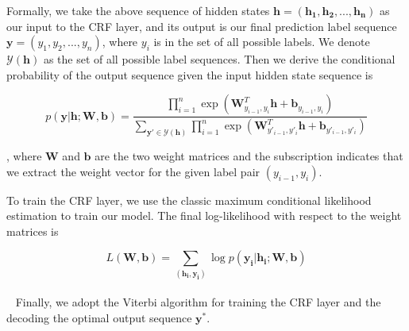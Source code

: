 Formally, we take the above sequence of hidden states  $ \mathbf{h} = ( \mathbf{h_1}, \mathbf{h_2},...,\mathbf{h_n})$ as our input to the CRF layer, and its output is our final prediction label sequence $\mathbf{y} = ( {y_1}, {y_2},...,{y_n})$, where $y_i$ is in the set of all possible labels. 
We denote $\mathcal{Y}(\mathbf{h})$ as the set of all possible label sequences.
Then we derive the conditional probability of the output sequence given the input hidden state sequence is 

{\scriptsize $$ p(\mathbf{y}|\mathbf{h}; \mathbf{W},\mathbf{b}) 
= \frac{\prod_{i=1}^n \exp(\mathbf{W}^T_{y_{i-1},y_{i}}\mathbf{h} + \mathbf{b}_{y_{i-1},y_{i}})}
{ \sum_{\mathbf{y'} \in \mathcal{Y}(\mathbf{h})} \prod_{i=1}^n \exp(\mathbf{W}^T_{y'_{i-1},y'_{i}}\mathbf{h} + \mathbf{b}_{y'_{i-1},y'_{i}})} 
$$
}

, where $\mathbf W$ and $\mathbf b$ are the two weight matrices and the subscription indicates that we extract the weight vector for the given label pair $(y_{i-1},y_i)$. 

To train the CRF layer, we use the classic maximum conditional likelihood estimation to train our model. 
The final log-likelihood with respect to the weight matrices is 

$$ L(\mathbf{W},\mathbf{b}) = \sum_{(\mathbf{h_i}, \mathbf{y_i})}  \log p(\mathbf{y_i}|\mathbf{h_i}; \mathbf{W},\mathbf{b}) $$
~\\~
Finally, we adopt the Viterbi algorithm for training the CRF layer and the decoding the optimal output sequence $\mathbf{y^*}$.



